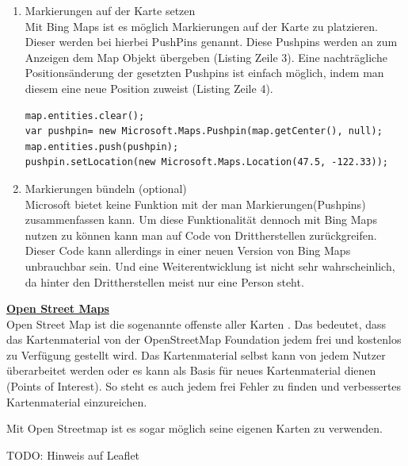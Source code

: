 \begin{enumerate}
\item Markierungen auf der Karte setzen\\
Mit Bing Maps ist es möglich Markierungen auf der Karte zu platzieren. Dieser werden bei hierbei PushPins genannt. Diese Pushpins werden an zum Anzeigen dem Map Objekt übergeben (Listing Zeile 3). Eine nachträgliche Positionsänderung der gesetzten Pushpins ist einfach möglich, indem man diesem eine neue Position zuweist (Listing Zeile 4).
\begin{lstlisting}
map.entities.clear(); 
var pushpin= new Microsoft.Maps.Pushpin(map.getCenter(), null); 
map.entities.push(pushpin); 
pushpin.setLocation(new Microsoft.Maps.Location(47.5, -122.33)); 
\end{lstlisting}\cite[Pushpins7]{bingmaps}

\item Markierungen bündeln (optional)\\
Microsoft bietet keine Funktion mit der man Markierungen(Pushpins) zusammenfassen kann. Um diese Funktionalität dennoch mit Bing Maps nutzen zu können kann man auf Code von Drittherstellen zurückgreifen. Dieser Code kann allerdings in einer neuen Version von Bing Maps unbrauchbar sein. Und eine Weiterentwicklung ist nicht sehr wahrscheinlich, da hinter den Drittherstellen meist nur eine Person steht. \cite[S. 92]{gruber2015}
\end{enumerate}


\textbf{\underline{Open Street Maps}}\\
Open Street Map ist die sogenannte \glqq offenste aller Karten \grqq \cite[S.92]{gruber2015}. Das bedeutet, dass das Kartenmaterial von der OpenStreetMap Foundation jedem frei und kostenlos zu Verfügung gestellt wird. Das Kartenmaterial selbst kann von jedem Nutzer überarbeitet werden oder es kann als Basis für neues Kartenmaterial dienen (Points of Interest). So steht es auch jedem frei Fehler zu finden und verbessertes Kartenmaterial einzureichen.

Mit Open Streetmap ist es sogar möglich seine eigenen Karten zu verwenden.

TODO: Hinweis auf Leaflet



